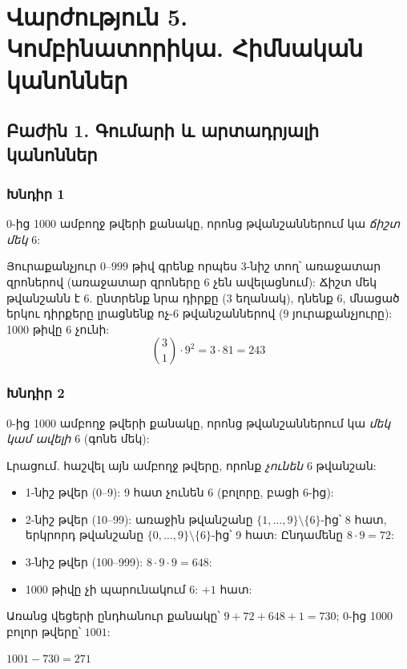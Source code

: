 
\section*{Վարժություն 5. Կոմբինատորիկա. Հիմնական կանոններ}

\subsection*{Բաժին 1. Գումարի և արտադրյալի կանոններ}

\subsubsection*{Խնդիր 1}
0-ից 1000 ամբողջ թվերի քանակը, որոնց թվանշաններում կա \emph{ճիշտ մեկ} 6:

Յուրաքանչյուր $0$--$999$ թիվ գրենք որպես 3-նիշ տող՝ առաջատար զրոներով (առաջատար զրոները 6 չեն ավելացնում): Ճիշտ մեկ թվանշանն է 6. ընտրենք նրա դիրքը ($3$ եղանակ), դնենք 6, մնացած երկու դիրքերը լրացնենք ոչ-6 թվանշաններով ($9$ յուրաքանչյուրը): 1000 թիվը 6 չունի:
\[ \binom{3}{1}\cdot 9^2 = 3\cdot 81 = \boxed{243} \]

\subsubsection*{Խնդիր 2}
0-ից 1000 ամբողջ թվերի քանակը, որոնց թվանշաններում կա \emph{մեկ կամ ավելի} 6 (գոնե մեկ):

Լրացում. հաշվել այն ամբողջ թվերը, որոնք \emph{չունեն} 6 թվանշան:
\begin{itemize}
  \item 1-նիշ թվեր (0--9): 9 հատ չունեն 6 (բոլորը, բացի 6-ից):
  \item 2-նիշ թվեր (10--99): առաջին թվանշանը $\{1,\dots,9\}\setminus\{6\}$-ից՝ 8 հատ, երկրորդ թվանշանը $\{0,\dots,9\}\setminus\{6\}$-ից՝ 9 հատ: Ընդամենը $8\cdot9=72$:
  \item 3-նիշ թվեր (100--999): $8\cdot9\cdot9=648$:
  \item 1000 թիվը չի պարունակում 6: $+1$ հատ:
\end{itemize}
Առանց վեցերի ընդհանուր քանակը՝ $9+72+648+1=730$; 0-ից 1000 բոլոր թվերը՝ $1001$:

$\boxed{1001 - 730 = 271}$

